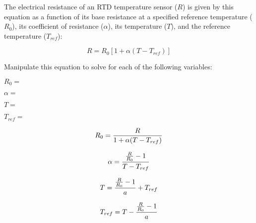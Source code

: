 

The electrical resistance of an RTD temperature sensor ($R$) is given by this equation as a function of its base resistance at a specified reference temperature ($R_0$), its coefficient of resistance ($\alpha$), its temperature ($T$), and the reference temperature ($T_{ref}$):

$$R = R_0 [1 + \alpha(T - T_{ref})]$$

Manipulate this equation to solve for each of the following variables:

\vskip 10pt

$R_0 =$

\vskip 10pt

$\alpha =$

\vskip 10pt

$T =$

\vskip 10pt

$T_{ref} =$

\vskip 10pt







$$R_0 = {R \over {1 + \alpha(T - T_{ref})}}$$

\vskip 20pt

$$\alpha = {{{R \over R_0} - 1} \over {T - T_{ref}}}$$

\vskip 20pt

$$T = {{{R \over R_0} - 1} \over a} + T_{ref}$$

\vskip 20pt

$$T_{ref} = T - {{{R \over R_0} - 1} \over a}$$











